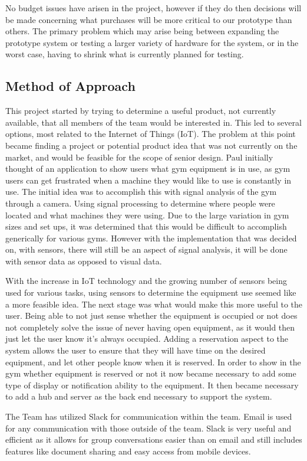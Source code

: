 \documentclass[PPFS.tex]{template/subfiles}
\begin{document}
    No budget issues have arisen in the project, however if they do then decisions will be made concerning what purchases will be more critical to our prototype than others. The primary problem which may arise being between expanding the prototype system or testing a larger variety of hardware for the system, or in the worst case, having to shrink what is currently planned for testing.  
	
	\subsection{Method of Approach}
	This project started by trying to determine a useful product, not currently available, that all members of the team would be interested in. This led to several options, most related to the Internet of Things (IoT). The problem at this point became finding a project or potential product idea that was not currently on the market, and would be feasible for the scope of senior design. Paul initially thought of an application to show users what gym equipment is in use, as gym users can get frustrated when a machine they would like to use is constantly in use. The initial idea was to accomplish this with signal analysis of the gym through a camera. Using signal processing to determine where people were located and what machines they were using. Due to the large variation in gym sizes and set ups, it was determined that this would be difficult to accomplish generically for various gyms. However with the implementation that was decided on, with sensors, there will still be an aspect of signal analysis, it will be done with sensor data as opposed to visual data.  
	
	With the increase in IoT technology and the growing number of sensors being used for various tasks, using sensors to determine the equipment use seemed like a more feasible idea. The next stage was what would make this more useful to the user. Being able to not just sense whether the equipment is occupied or not does not completely solve the issue of never having open equipment, as it would then just let the user know it's always occupied. Adding a reservation aspect to the system allows the user to ensure that they will have time on the desired equipment, and let other people know when it is reserved. In order to show in the gym whether equipment is reserved or not it now became necessary to add some type of display or notification ability to the equipment. It then became necessary to add a hub and server as the back end necessary to support the system.
	
	The Team has utilized Slack for communication within the team. Email is used for any communication with those outside of the team. Slack is very useful and efficient as it allows for group conversations easier than on email and still includes features like document sharing and easy access from mobile devices. 
	
\end{document}
